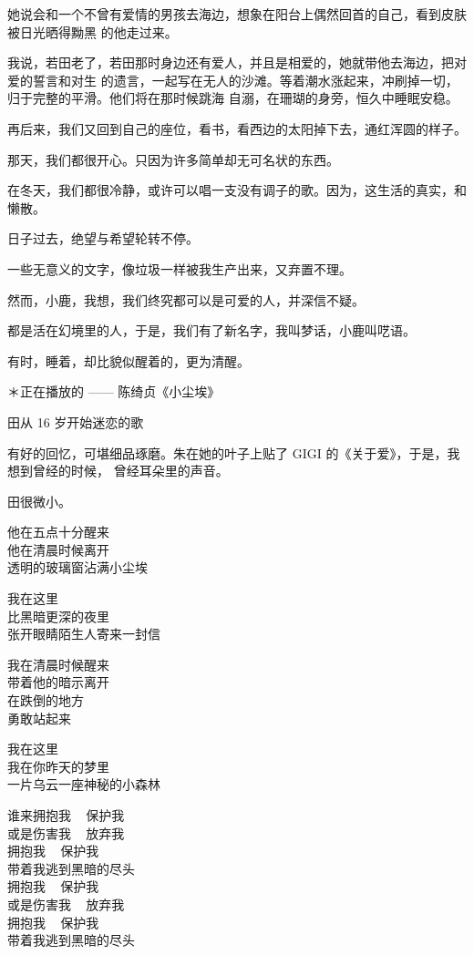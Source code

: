 		她说会和一个不曾有爱情的男孩去海边，想象在阳台上偶然回首的自己，看到皮肤被日光晒得黝黑
	的他走过来。

		我说，若田老了，若田那时身边还有爱人，并且是相爱的，她就带他去海边，把对爱的誓言和对生
	的遗言，一起写在无人的沙滩。等着潮水涨起来，冲刷掉一切，归于完整的平滑。他们将在那时候跳海
	自溺，在珊瑚的身旁，恒久中睡眠安稳。

		再后来，我们又回到自己的座位，看书，看西边的太阳掉下去，通红浑圆的样子。\par
		那天，我们都很开心。只因为许多简单却无可名状的东西。

		在冬天，我们都很冷静，或许可以唱一支没有调子的歌。因为，这生活的真实，和懒散。\par
		日子过去，绝望与希望轮转不停。\par
		一些无意义的文字，像垃圾一样被我生产出来，又弃置不理。

		然而，小鹿，我想，我们终究都可以是可爱的人，并深信不疑。\par
		都是活在幻境里的人，于是，我们有了新名字，我叫梦话，小鹿叫呓语。

		有时，睡着，却比貌似醒着的，更为清醒。


		\vspace{1em}

		＊正在播放的 —— 陈绮贞《小尘埃》

		田从 16 岁开始迷恋的歌

		有好的回忆，可堪细品琢磨。朱在她的叶子上贴了 GIGI 的《关于爱》，于是，我想到曾经的时候，
	曾经耳朵里的声音。

		田很微小。

		\longpoem{}{}{}
			他在五点十分醒来 \\
			他在清晨时候离开 \\
			透明的玻璃窗沾满小尘埃

			我在这里 \\
			比黑暗更深的夜里 \\
			张开眼睛陌生人寄来一封信

			我在清晨时候醒来 \\
			带着他的暗示离开 \\
			在跌倒的地方 \\
			勇敢站起来

			我在这里 \\
			我在你昨天的梦里 \\
			一片乌云一座神秘的小森林

			谁来拥抱我 ~ 保护我 \\
			或是伤害我 ~ 放弃我 \\
			拥抱我 ~ 保护我 \\
			带着我逃到黑暗的尽头 \\
			拥抱我 ~ 保护我 \\
			或是伤害我 ~ 放弃我 \\
			拥抱我 ~ 保护我 \\
			带着我逃到黑暗的尽头

